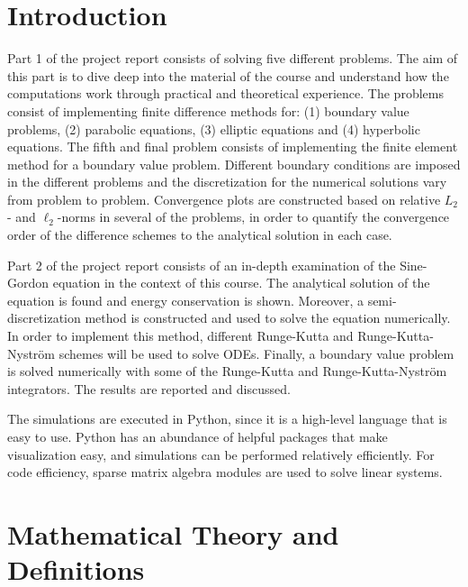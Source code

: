 \documentclass[a4paper, 12pt]{book}
\theoremstyle{break}
\theoremstyle{plain}
\begin{document}
\chapter{Introduction}

\noindent Part 1 of the project report consists of solving five different problems. The aim of this part is to dive deep into the material of the course and understand how the computations work through practical and theoretical experience. The problems consist of implementing finite difference methods for: (1) boundary value problems, (2) parabolic equations, (3) elliptic equations and (4) hyperbolic equations. The fifth and final problem consists of implementing the finite element method for a boundary value problem. Different boundary conditions are imposed in the different problems and the discretization for the numerical solutions vary from problem to problem. Convergence plots are constructed based on relative $L_2$- and $\ell_2$-norms in several of the problems, in order to quantify the convergence order of the difference schemes to the analytical solution in each case. \newline

\noindent Part 2 of the project report consists of an in-depth examination of the Sine-Gordon equation in the context of this course. The analytical solution of the equation is found and energy conservation is shown. Moreover, a semi-discretization method is constructed and used to solve the equation numerically. In order to implement this method, different Runge-Kutta and Runge-Kutta-Nyström schemes will be used to solve ODEs. Finally, a boundary value problem is solved numerically with some of the Runge-Kutta and Runge-Kutta-Nyström integrators. The results are reported and discussed. \newline

\noindent The simulations are executed in Python, since it is a high-level language that is easy to use. Python has an abundance of helpful packages that make visualization easy, and simulations can be performed relatively efficiently. For code efficiency, sparse matrix algebra modules are used to solve linear systems. 

\listoffigures %

\chapter{Mathematical Theory and Definitions}

\newpage
\end{document}
